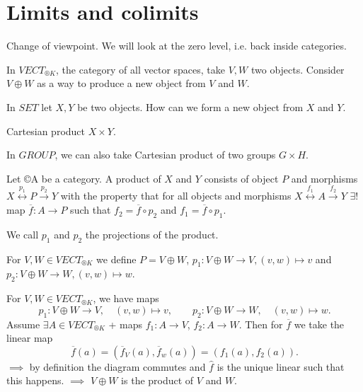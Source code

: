 \documentclass[12pt]{article}					%
\begin{document}
\section{Limits and colimits}
\begin{poznamka}
	Change of viewpoint. We will look at the zero level, i.e. back inside categories.
\end{poznamka}

\begin{priklady}
	In $VECT_{®K}$, the category of all vector spaces, take $V, W$ two objects. Consider $V \oplus W$ as a way to produce a new object from $V$ and $W$.
\end{priklady}

\begin{priklad}
	In $SET$ let $X, Y$ be two objects. How can we form a new object from $X$ and $Y$.

	\begin{reseni}
		Cartesian product $X \times Y$.
	\end{reseni}
\end{priklad}

\begin{priklady}
	In $GROUP$, we can also take Cartesian product of two groups $G \times H$.
\end{priklady}

\begin{definice}
	Let ©A be a category. A product of $X$ and $Y$ consists of object $P$ and morphisms $X \overset{p_1} \leftrightarrow P \overset{p_2}\rightarrow Y$ with the property that for all objects and morphisms $X \overset{f_1} \leftrightarrow A \overset{f_2}\rightarrow Y$ $\exists!$ map $\overline{f}: A \rightarrow P$ such that $f_2 = \overline{f} ∘ p_2$ and $f_1 = \overline{f} ∘ p_1$.

	We call $p_1$ and $p_2$ the projections of the product.
\end{definice}

\begin{priklady}
	For $V, W \in VECT_{®K}$ we define $P = V \oplus W$, $p_1: V \oplus W \rightarrow V, (v, w) \mapsto v$ and $p_2: V \oplus W \rightarrow W, (v, w) \mapsto w$.
\end{priklady}


\begin{priklady}
	For $V, W \in VECT_{®K}$, we have maps
	$$ p_1: V \oplus W \rightarrow V, \quad (v, w) \mapsto v, \qquad p_2: V \oplus W \rightarrow W, \quad (v, w) \mapsto w. $$
	Assume $\exists A \in VECT_{®K}$ + maps $f_1: A \rightarrow V$, $f_2: A \rightarrow W$. Then for $\overline{f}$ we take the linear map
	$$ \overline{f}(a) = (\overline{f}_V(a), \overline{f}_w(a)) = (f_1(a), f_2(a)). $$
	$\implies$ by definition the diagram commutes and $\hat{f}$ is the unique linear such that this happens. $\implies$ $V \oplus W$ is the product of $V$ and $W$.
\end{priklady}
\end{document}
